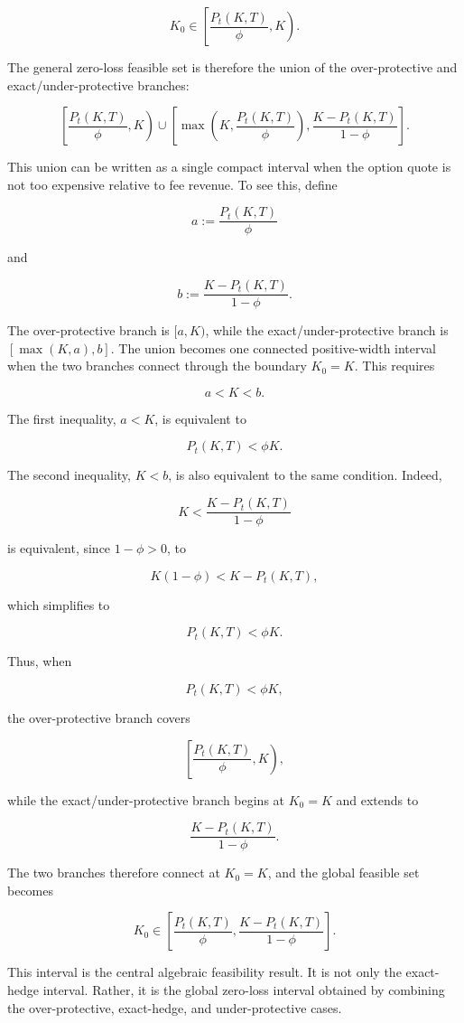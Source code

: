 \documentclass[11pt]{article}
\begin{document}
$$
K_0 \in \left[   \frac{P_t(K,T)}{\phi}, K \right).
$$

The general zero-loss feasible set is therefore the union of the over-protective and exact/under-protective branches:

$$
\left[   \frac{P_t(K,T)}{\phi}, K \right) \cup
\left[ 
\max\left(K, \frac{P_t(K,T)}{\phi} \right),
\frac{K - P_t(K,T)}{1 - \phi}
 \right].
$$

This union can be written as a single compact interval when the option quote is not too expensive relative to fee revenue. To see this, define

$$
a:=\frac{P_t(K,T)}{\phi}
$$

and

$$
b:=\frac{K-P_t(K,T)}{1-\phi}.
$$

The over-protective branch is $[a,K)$, while the exact/under-protective branch is $[\max(K,a),b]$. The union becomes one connected positive-width interval when the two branches connect through the boundary $K_0=K$. This requires

$$
a<K<b.
$$

The first inequality, $a<K$, is equivalent to

$$
P_t(K,T)<\phi K.
$$

The second inequality, $K<b$, is also equivalent to the same condition. Indeed,

$$
K<\frac{K-P_t(K,T)}{1-\phi}
$$

is equivalent, since $1-\phi>0$, to

$$
K(1-\phi)<K-P_t(K,T),
$$

which simplifies to

$$
P_t(K,T)<\phi K.
$$

Thus, when

$$
P_t(K,T)<\phi K,
$$

the over-protective branch covers

$$
\left[\frac{P_t(K,T)}{\phi},K\right),
$$

while the exact/under-protective branch begins at $K_0=K$ and extends to

$$
\frac{K-P_t(K,T)}{1-\phi}.
$$

The two branches therefore connect at $K_0=K$, and the global feasible set becomes

$$
K_0 \in
\left[
\frac{P_t(K,T)}{\phi},
\frac{K-P_t(K,T)}{1-\phi}
\right].
$$

This interval is the central algebraic feasibility result. It is not only the exact-hedge interval. Rather, it is the global zero-loss interval obtained by combining the over-protective, exact-hedge, and under-protective cases.
\end{document}
